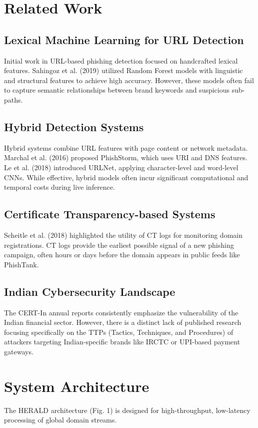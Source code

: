 \documentclass[journal]{IEEEtran}
\begin{document}
\section{Related Work}
\subsection{Lexical Machine Learning for URL Detection}
Initial work in URL-based phishing detection focused on handcrafted lexical features. Sahingoz et al. (2019) utilized Random Forest models with linguistic and structural features to achieve high accuracy. However, these models often fail to capture semantic relationships between brand keywords and suspicious sub-paths.

\subsection{Hybrid Detection Systems}
Hybrid systems combine URL features with page content or network metadata. Marchal et al. (2016) proposed PhishStorm, which uses URI and DNS features. Le et al. (2018) introduced URLNet, applying character-level and word-level CNNs. While effective, hybrid models often incur significant computational and temporal costs during live inference.

\subsection{Certificate Transparency-based Systems}
Scheitle et al. (2018) highlighted the utility of CT logs for monitoring domain registrations. CT logs provide the earliest possible signal of a new phishing campaign, often hours or days before the domain appears in public feeds like PhishTank.

\subsection{Indian Cybersecurity Landscape}
The CERT-In annual reports consistently emphasize the vulnerability of the Indian financial sector. However, there is a distinct lack of published research focusing specifically on the TTPs (Tactics, Techniques, and Procedures) of attackers targeting Indian-specific brands like IRCTC or UPI-based payment gateways.

\section{System Architecture}
The HERALD architecture (Fig. 1) is designed for high-throughput, low-latency processing of global domain streams.
\end{document}
